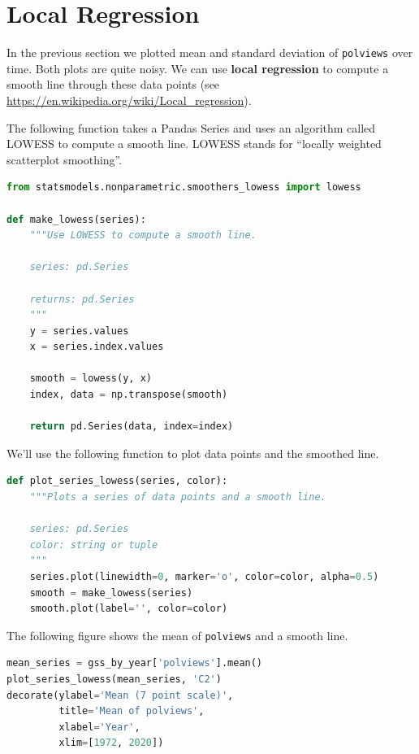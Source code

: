 \hypertarget{local-regression}{%
\section{Local Regression}\label{local-regression}}

In the previous section we plotted mean and standard deviation of
\passthrough{\lstinline!polviews!} over time. Both plots are quite
noisy. We can use \textbf{local regression} to compute a smooth line
through these data points (see
\url{https://en.wikipedia.org/wiki/Local_regression}).

The following function takes a Pandas Series and uses an algorithm
called LOWESS to compute a smooth line. LOWESS stands for ``locally
weighted scatterplot smoothing''.

\begin{lstlisting}[language=Python,style=source]
from statsmodels.nonparametric.smoothers_lowess import lowess

def make_lowess(series):
    """Use LOWESS to compute a smooth line.
    
    series: pd.Series
    
    returns: pd.Series
    """
    y = series.values
    x = series.index.values

    smooth = lowess(y, x)
    index, data = np.transpose(smooth)

    return pd.Series(data, index=index) 
\end{lstlisting}

We'll use the following function to plot data points and the smoothed
line.

\begin{lstlisting}[language=Python,style=source]
def plot_series_lowess(series, color):
    """Plots a series of data points and a smooth line.
    
    series: pd.Series
    color: string or tuple
    """
    series.plot(linewidth=0, marker='o', color=color, alpha=0.5)
    smooth = make_lowess(series)
    smooth.plot(label='', color=color)
\end{lstlisting}

The following figure shows the mean of
\passthrough{\lstinline!polviews!} and a smooth line.

\begin{lstlisting}[language=Python,style=source]
mean_series = gss_by_year['polviews'].mean()
plot_series_lowess(mean_series, 'C2')
decorate(ylabel='Mean (7 point scale)',
         title='Mean of polviews',
         xlabel='Year',
         xlim=[1972, 2020])
\end{lstlisting}

